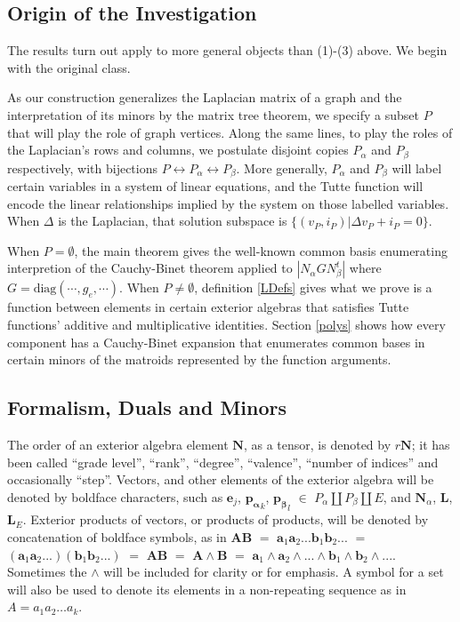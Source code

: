 \documentclass[Unicode]{cedram-alco}
\newcommand{\ext}[1]{\ensuremath{\mathbf{#1}}}
\newcommand{\dunion}{\coprod}
\begin{document}
\subsection{Origin of the Investigation}
The results turn out apply to more general objects than (1)-(3) above.  We
begin with the original class.

As our construction generalizes the Laplacian matrix of
a graph and the interpretation of its minors by the
matrix tree theorem\cite{sdcMTT},
we specify a subset $P$ that will play the role of graph vertices.
Along the same lines, to play the roles of the Laplacian's
rows and columns, we postulate disjoint copies $P_\alpha$ and
$P_\beta$ respectively, with bijections
$P \leftrightarrow P_{\alpha}\leftrightarrow P_{\beta}$.
More generally, $P_\alpha$ and $P_\beta$ will
label certain variables in a system of linear
equations, and the Tutte function will encode
the linear relationships implied by the system
on those labelled variables.  When $\Delta$ is the
Laplacian, that solution subspace is
$\{(v_P, i_P) | \Delta v_P + i_P = 0\}$.

When $P=\emptyset$, the main theorem gives the well-known common basis
enumerating interpretion of the Cauchy-Binet theorem applied to
$|N_\alpha G N_\beta^t|$
where $G=\text{diag}(\cdots, g_e , \cdots )$.
When $P\neq\emptyset$, definition \ref{LDefs} gives what we prove
is a function between
elements in certain
exterior algebras that satisfies Tutte functions'
additive and multiplicative identities.  Section \ref{polys} shows how
every component has a Cauchy-Binet expansion that enumerates
common bases in certain minors of the matroids represented by
the function arguments.

\subsection{Formalism, Duals and Minors}

The order of an exterior algebra element $\ext{N}$, as a tensor,
is denoted by $r\ext{N}$; it has been 
called ``grade level'', ``rank'', ``degree'',
``valence'', ``number of indices''
and occasionally\cite{RotaCayley} ``step''.
Vectors, and other elements of the
exterior algebra will be denoted by boldface
characters, such as $\ext{e}_j$, $\ext{p_\alpha}_k$,
$\ext{p_\beta}_l$ $\in$ $P_\alpha \dunion P_\beta \dunion E$,
and $\ext{N}_\alpha$, $\ext{L}$, $\ext{L}_E$.  Exterior products
of vectors, or products of products, will be denoted by
concatenation of boldface symbols, as in $\ext{AB}$
 $=$ $\ext{a}_1\ext{a}_2...\ext{b}_1\ext{b}_2...$ $=$
$(\ext{a}_1\ext{a}_2...)(\ext{b}_1\ext{b}_2...)$ $=$
$\ext{A}\ext{B}$ $=$ $\ext{A}\wedge\ext{B}$ $=$ 
$\ext{a}_1\wedge\ext{a}_2\wedge...\wedge\ext{b}_1\wedge\ext{b}_2\wedge...$.
Sometimes the $\wedge$ will be included for clarity or for emphasis.
A symbol for a set will also be used to denote its elements
in a non-repeating sequence as in $A=a_1a_2\ldots a_k$.
\end{document}
